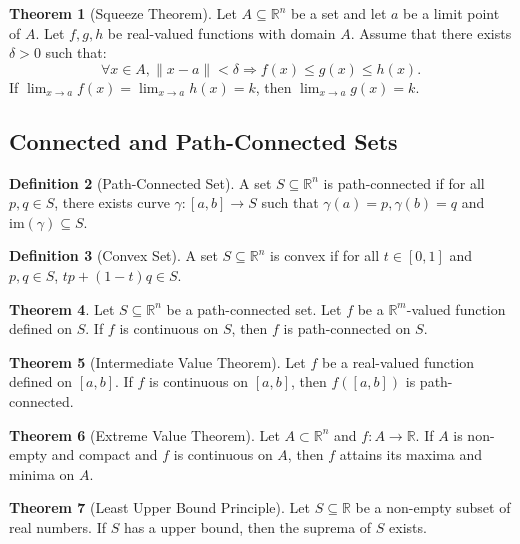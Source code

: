 \documentclass[12pt]{article}
\theoremstyle{definition}
\newtheorem{definition}{Definition}[subsection]
\newtheorem{theorem}[definition]{Theorem}
\theoremstyle{remark}
\begin{document}
\begin{theorem}[Squeeze Theorem]
Let $A\subseteq\mathbb{R}^n$ be a set and let $a$ be a limit point of $A$. Let $f,g,h$ be real-valued functions with domain $A$. Assume that there exists $\delta>0$ such that:
\[
\forall x\in A, \|x-a\|<\delta\Rightarrow f(x)\le g(x)\le h(x).
\]
If $\displaystyle \lim_{x\to a}f(x)=\lim_{x\to a}h(x)=k$, then $\displaystyle\lim_{x\to a}g(x)=k$.
\end{theorem}

\subsection{Connected and Path-Connected Sets}

\begin{definition}[Path-Connected Set]
A set $S\subseteq\mathbb{R}^n$ is path-connected if for all $p,q\in S$, there exists curve $\gamma:[a,b]\to S$ such that $\gamma(a)=p,\gamma(b)=q$ and  $\text{im}(\gamma)\subseteq S$.
\end{definition}

\begin{definition}[Convex Set]
A set $S\subseteq\mathbb{R}^n$ is convex if for all $t\in [0,1]$ and $p,q\in S$, $tp+(1-t)q\in S$.
\end{definition}

\begin{theorem}
Let $S\subseteq\mathbb{R}^n$ be a path-connected set. Let $f$ be a $\mathbb{R}^m$-valued function defined on $S$. If $f$ is continuous on $S$, then $f$ is path-connected on $S$.
\end{theorem}

\begin{theorem}[Intermediate Value Theorem]
Let $f$ be a real-valued function defined on $[a,b]$. If $f$ is continuous on $[a,b]$, then $f([a,b])$ is path-connected.
\end{theorem}

\begin{theorem}[Extreme Value Theorem]
Let $A\subset\mathbb{R}^n$ and $f:A\to\mathbb{R}$. If $A$ is non-empty and compact and $f$ is continuous on $A$, then $f$ attains its maxima and minima on $A$.
\end{theorem}

\begin{theorem}[Least Upper Bound Principle]
Let $S\subseteq\mathbb{R}$ be a non-empty subset of real numbers. If $S$ has a upper bound, then the suprema of $S$ exists.
\end{theorem}
\end{document}
